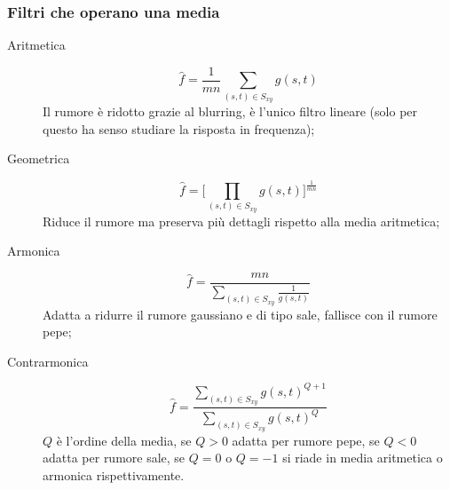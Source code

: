 \subsubsection{Filtri che operano una media}
\begin{description}
	\item [Aritmetica] 
		\begin{equation}
			\hat{f} = \frac{1}{mn} \sum_{(s,t)\in S_{xy}} g(s,t)
		\end{equation}
		Il rumore è ridotto grazie al blurring, è l'unico filtro lineare (solo per questo ha senso studiare la risposta in frequenza);
	\item[Geometrica]
		\begin{equation}
			\hat{f} =\Bigg[\prod_{(s,t)\in S_{xy}} g(s,t)\Bigg]^{\frac{1}{mn}}
		\end{equation}
		Riduce il rumore ma preserva più dettagli rispetto alla media aritmetica;
	\item[Armonica]
		\begin{equation}
			\hat{f} = \frac{mn} {\sum_{(s,t)\in S_{xy}} \frac{1}{g(s,t)}}
		\end{equation}
		Adatta a ridurre il rumore gaussiano e di tipo sale, fallisce con il rumore pepe;
	\item[Contrarmonica]
		\begin{equation}
			\hat{f} = \frac{\sum_{(s,t)\in S_{xy}} g(s,t)^{Q+1}} {\sum_{(s,t)\in S_{xy}} g(s,t)^Q}
		\end{equation}
		$Q$ è l'ordine della media, se $Q>0$ adatta per rumore pepe, se $Q<0$ adatta per rumore sale, se $Q=0$ o $Q=-1$ si riade in media aritmetica o armonica rispettivamente.
\end{description}

